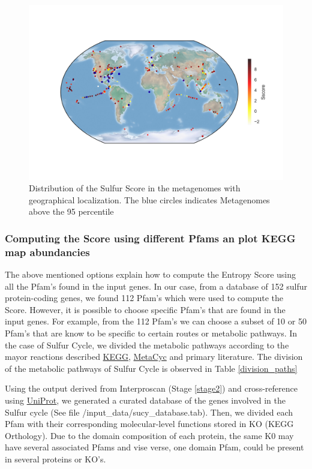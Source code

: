 \documentclass[12pt]{report}
\begin{document}
\begin{figure}[H]
  \centering
    \includegraphics[width=160mm, scale =1]{world_map_SS.png}
    \caption{Distribution of the Sulfur Score in the metagenomes with geographical localization. The blue circles indicates Metagenomes above the 95 percentile}
        \label{fig:differential}
\end{figure}

\subsubsection{Computing the Score using different Pfams an plot KEGG map abundancies}

The above mentioned options explain how to compute the Entropy Score using all the Pfam's found in the input genes. In our case, from a database of 152 sulfur protein-coding genes, we found 112 Pfam's which were used to compute the Score. However, it is possible to choose specific Pfam's that are found in the input genes. For example, from the 112 Pfam's we can choose a subset of 10 or 50 Pfam's that are know to be specific to certain routes or metabolic pathways.
In the case of Sulfur Cycle, we divided the metabolic pathways according to the mayor reactions described \href{http://www.genome.jp/kegg/}{KEGG},  \href{https://metacyc.org/}{MetaCyc} and primary literature. The division of the metabolic pathways of Sulfur Cycle is observed in Table \ref{division_paths} 

Using the output derived from Interproscan (Stage \ref{stage2}) and cross-reference using  \href{http://www.uniprot.org/}{UniProt}, we generated a curated database of the genes involved in the Sulfur cycle (See file /input\_data/sucy\_database.tab). Then, we divided each Pfam with their corresponding molecular-level functions stored in  KO (KEGG Orthology). Due to the domain composition of each protein, the same K0 may have several associated Pfams and vise verse, one domain Pfam, could be present in several proteins or KO's.  
\end{document}
